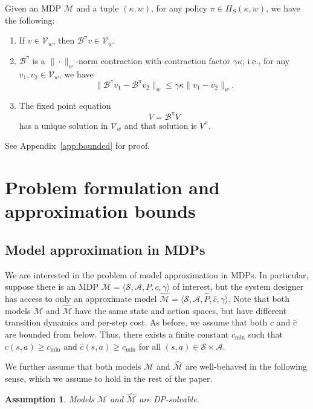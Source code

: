 \documentclass[letterpaper, 10pt]{IEEEtran}
\newtheorem{assumption}{Assumption}
\newcommand*\ALPHABET{\mathcal}
\newcommand*\BELLMAN{\mathscr{B}}
\newcommand*\tuple{\kappa, w}
\begin{document}
\begin{lemma}\label{lem:bounded}
    Given an MDP $\ALPHABET M$ and a tuple $(\tuple)$, 
    for any policy $\pi \in \Pi_S(\tuple)$, we have the following:
    \begin{enumerate}
        \item If $v \in \ALPHABET V_w$, then $\BELLMAN^\pi v \in \ALPHABET V_w$.
        \item $\BELLMAN^\pi$ is a $\|\cdot\|_w$-norm contraction with contraction factor $\gamma \kappa$, i.e., for any  $v_1, v_2 \in  \ALPHABET V_w$, 
        we have
      \[
         \| \BELLMAN^\pi v_1 - \BELLMAN^\pi v_2 \|_w 
         \le
         \gamma \kappa \| v_1 - v_2 \|_w.
      \]
      \item The fixed point equation
      \[
           V = \BELLMAN^\pi V
      \]
      has a unique solution in $\ALPHABET V_w$ and that solution is $V^\pi$.
    \end{enumerate}
\end{lemma}
See Appendix~\ref{app:bounded} for proof.

\section{Problem formulation and approximation bounds}\label{sec:main_results}
\subsection{Model approximation in MDPs}
We are interested in the problem of model approximation in MDPs. In particular, suppose there is an MDP $\ALPHABET M = \langle \ALPHABET S, \ALPHABET A, P, c, \gamma \rangle$ of interest, but the system designer has access to only an approximate model $\hat {\ALPHABET M} = \langle \ALPHABET S, \ALPHABET A, \hat P, \hat c, \gamma \rangle$. Note that both models $\ALPHABET M$ and $\hat {\ALPHABET M}$ have the same state and action spaces, but have different transition dynamics and per-step cost. As before, we assume that both $c$ and $\hat c$ are  bounded from below. Thus, there exists a finite constant $c_{\min}$ such that $c(s,a) \ge c_{\min}$ and $\hat c(s,a) \ge c_{\min}$ for all $(s,a) \in \ALPHABET S \times \ALPHABET A$. 

We further assume that both models $\ALPHABET M$ and $\hat {\ALPHABET M}$ are well-behaved in the following sense, which we assume to hold in the rest of the paper.
\begin{assumption}\label{assm:DP-solvability}
    Models $\ALPHABET M$ and $\hat {\ALPHABET M}$ are DP-solvable. 
\end{assumption}
\end{document}
